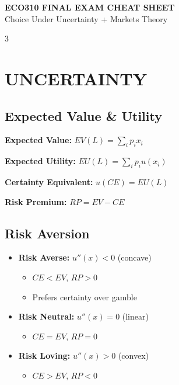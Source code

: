 \documentclass[8pt,landscape,letterpaper]{extarticle}
\begin{document}
\begin{center}
{\LARGE\bfseries\color{criticalcolor} ECO310 FINAL EXAM CHEAT SHEET}\\
\vspace{2pt}
{\small Choice Under Uncertainty + Markets Theory}
\end{center}

\begin{multicols}{3}
\setlength{\columnseprule}{0.4pt}

\section*{UNCERTAINTY}

\subsection*{Expected Value \& Utility}
\begin{keybox}
\textbf{Expected Value:} $EV(L) = \sum_i p_i x_i$

\textbf{Expected Utility:} $EU(L) = \sum_i p_i u(x_i)$

\textbf{Certainty Equivalent:} $u(CE) = EU(L)$

\textbf{Risk Premium:} $RP = EV - CE$
\end{keybox}

\subsection*{Risk Aversion}
\begin{itemize}
\item \textbf{Risk Averse:} $u''(x) < 0$ (concave)
  \begin{itemize}
  \item $CE < EV$, $RP > 0$
  \item Prefers certainty over gamble
  \end{itemize}
\item \textbf{Risk Neutral:} $u''(x) = 0$ (linear)
  \begin{itemize}
  \item $CE = EV$, $RP = 0$
  \end{itemize}
\item \textbf{Risk Loving:} $u''(x) > 0$ (convex)
  \begin{itemize}
  \item $CE > EV$, $RP < 0$
  \end{itemize}
\end{itemize}


\end{multicols}
\end{document}
